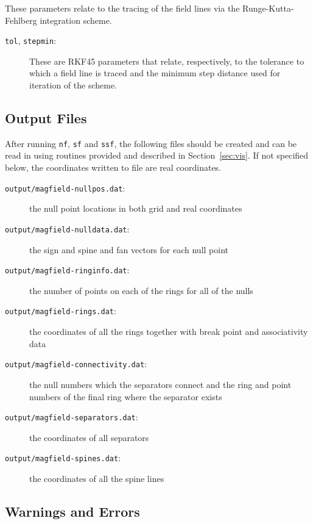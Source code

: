 \documentclass[12pt]{article}
\begin{document}
        These parameters relate to the tracing of the field lines via the Runge-Kutta-Fehlberg integration scheme.
        \begin{description}
          \item [\texttt{tol}, \texttt{stepmin}:] These are RKF45 parameters that relate, respectively, to the tolerance to which a field line is traced and the minimum step distance used for iteration of the scheme.
        \end{description}

    \subsection{Output Files}

      After running \texttt{nf}, \texttt{sf} and \texttt{ssf}, the following files should be created and can be read in using routines provided and described in Section~\ref{sec:vis}. If not specified below, the coordinates written to file are real coordinates.
      \begin{description}
        \item [\texttt{output/magfield-nullpos.dat}:] the null point locations in both grid and real coordinates
        \item [\texttt{output/magfield-nulldata.dat}:] the sign and spine and fan vectors for each null point
        \item [\texttt{output/magfield-ringinfo.dat}:] the number of points on each of the rings for all of the nulls
        \item [\texttt{output/magfield-rings.dat}:] the coordinates of all the rings together with break point and associativity data
        \item [\texttt{output/magfield-connectivity.dat}:] the null numbers which the separators connect and the ring and point numbers of the final ring where the separator exists
        \item [\texttt{output/magfield-separators.dat}:] the coordinates of all separators
        \item [\texttt{output/magfield-spines.dat}:] the coordinates of all the spine lines
      \end{description}

    \subsection{Warnings and Errors}
\end{document}
